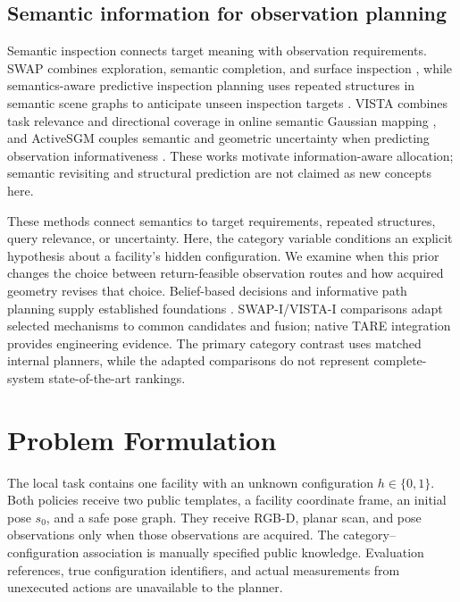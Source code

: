 \documentclass[pdflatex,sn-mathphys-num]{sn-jnl}
\begin{document}
\hypertarget{semantic-information-for-observation-planning}{%
\subsection{Semantic information for observation planning}\label{semantic-information-for-observation-planning}}

Semantic inspection connects target meaning with observation requirements. SWAP combines exploration, semantic completion, and surface inspection \cite{ref2}, while semantics-aware predictive inspection planning uses repeated structures in semantic scene graphs to anticipate unseen inspection targets \cite{ref7}. VISTA combines task relevance and directional coverage in online semantic Gaussian mapping \cite{ref3}, and ActiveSGM couples semantic and geometric uncertainty when predicting observation informativeness \cite{ref8}. These works motivate information-aware allocation; semantic revisiting and structural prediction are not claimed as new concepts here.

These methods connect semantics to target requirements, repeated structures, query relevance, or uncertainty. Here, the category variable conditions an explicit hypothesis about a facility's hidden configuration. We examine when this prior changes the choice between return-feasible observation routes and how acquired geometry revises that choice. Belief-based decisions and informative path planning supply established foundations \cite{ref12,ref13}. SWAP-I/VISTA-I comparisons adapt selected mechanisms to common candidates and fusion; native TARE integration provides engineering evidence. The primary category contrast uses matched internal planners, while the adapted comparisons do not represent complete-system state-of-the-art rankings.

\hypertarget{problem-formulation}{%
\section{Problem Formulation}\label{problem-formulation}}

The local task contains one facility with an unknown configuration \(h\in\{0,1\}\). Both policies receive two public templates, a facility coordinate frame, an initial pose \(s_0\), and a safe pose graph. They receive RGB-D, planar scan, and pose observations only when those observations are acquired. The category--configuration association is manually specified public knowledge. Evaluation references, true configuration identifiers, and actual measurements from unexecuted actions are unavailable to the planner.
\end{document}
